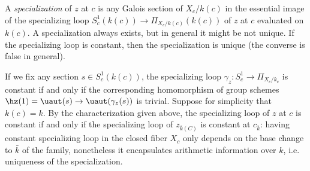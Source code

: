 \begin{definition}
\notready\label{loopdef}
	A \emph{specialization} of $z$ at $c$ is any Galois section of $X_{c}/k(c)$ in the essential image of the specializing loop $S^{1}_{c}(k(c))\to\Pi_{X_{c}/k(c)}(k(c))$ of $z$ at $c$ evaluated on $k(c)$. A specialization always exists, but in general it might be not unique. If the specializing loop is constant, then the specialization is unique (the converse is false in general).
\end{definition}

If we fix any section $s\in S^{1}_{c}(k(c))$, the specializing loop $\gamma_{z}:S^{1}_{c}\to\Pi_{X_{c}/k_{c}}$ is constant if and only if the corresponding homomorphism of group schemes $\hz(1)=\uaut(s)\to\uaut(\gamma_{z}(s))$ is trivial. Suppose for simplicity that $k(c)=k$. By the characterization given above, the specializing loop of $z$ at $c$ is constant if and only if the specializing loop of $z_{\bar{k}(C)}$ is constant at $c_{\bar{k}}$: having constant specializing loop in the closed fiber $X_{c}$ only depends on the base change to $\bar{k}$ of the family, nonetheless it encapsulates arithmetic information over $k$, i.e. uniqueness of the specialization.


